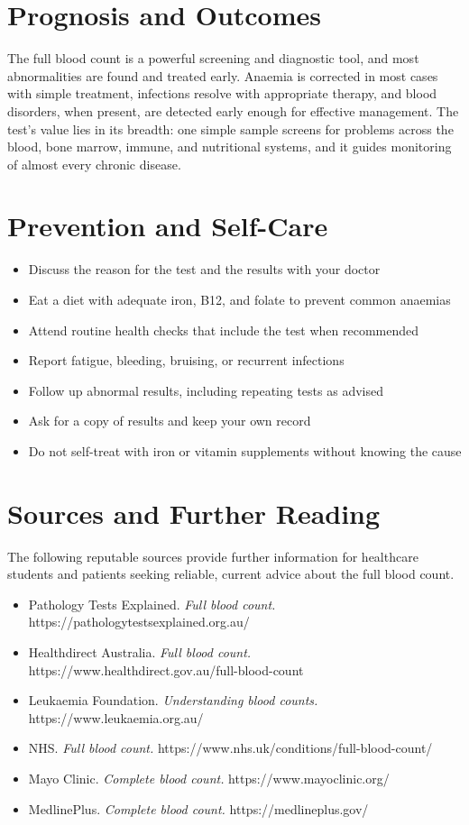 \section*{Prognosis and Outcomes}
The full blood count is a powerful screening and diagnostic tool, and most abnormalities are found and treated early. Anaemia is corrected in most cases with simple treatment, infections resolve with appropriate therapy, and blood disorders, when present, are detected early enough for effective management. The test's value lies in its breadth: one simple sample screens for problems across the blood, bone marrow, immune, and nutritional systems, and it guides monitoring of almost every chronic disease.

\section*{Prevention and Self-Care}
\begin{itemize}
    \item Discuss the reason for the test and the results with your doctor
    \item Eat a diet with adequate iron, B12, and folate to prevent common anaemias
    \item Attend routine health checks that include the test when recommended
    \item Report fatigue, bleeding, bruising, or recurrent infections
    \item Follow up abnormal results, including repeating tests as advised
    \item Ask for a copy of results and keep your own record
    \item Do not self-treat with iron or vitamin supplements without knowing the cause
\end{itemize}

\section*{Sources and Further Reading}
The following reputable sources provide further information for healthcare students and patients seeking reliable, current advice about the full blood count.
\begin{itemize}
    \item Pathology Tests Explained. \textit{Full blood count.} https://pathologytestsexplained.org.au/
    \item Healthdirect Australia. \textit{Full blood count.} https://www.healthdirect.gov.au/full-blood-count
    \item Leukaemia Foundation. \textit{Understanding blood counts.} https://www.leukaemia.org.au/
    \item NHS. \textit{Full blood count.} https://www.nhs.uk/conditions/full-blood-count/
    \item Mayo Clinic. \textit{Complete blood count.} https://www.mayoclinic.org/
    \item MedlinePlus. \textit{Complete blood count.} https://medlineplus.gov/
\end{itemize}
